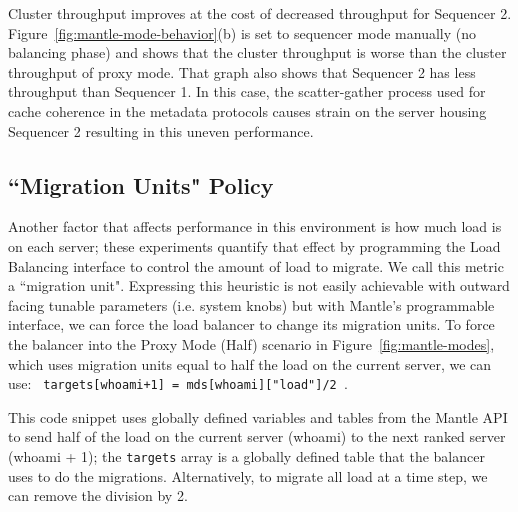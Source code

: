 Cluster throughput improves at the cost of decreased throughput for Sequencer
2.  Figure~\ref{fig:mantle-mode-behavior}(b) is set to sequencer mode manually
(no balancing phase) and shows that the cluster throughput is worse than the
cluster throughput of proxy mode. That graph also shows that Sequencer 2 has
less throughput than Sequencer 1. In this case, the scatter-gather process used
for cache coherence in the metadata protocols causes strain on the server
housing Sequencer 2 resulting in this uneven performance. 

\subsection{``Migration Units" Policy}
\label{sec:feature-migration-units}

Another factor that affects performance in this environment is how much load is
on each server; these experiments quantify that effect by programming the Load
Balancing interface to control the amount of load to migrate. We call this
metric a ``migration unit".  Expressing this heuristic is not easily achievable
with outward facing tunable parameters (i.e. system knobs) but with Mantle's
programmable interface, we can force the load balancer to change its migration
units. To force the balancer into the Proxy Mode (Half) scenario in
Figure~\ref{fig:mantle-modes}, which uses migration units equal to half the
load on the current server, we can use: \texttt{ targets[whoami+1] =
mds[whoami]["load"]/2 }.

This code snippet uses globally defined variables and tables from the Mantle
API to send half of the load on the current server (whoami) to the next ranked
server (whoami + 1); the \texttt{targets} array is a globally defined table
that the balancer uses to do the migrations.  Alternatively, to migrate all
load at a time step, we can remove the division by 2.


